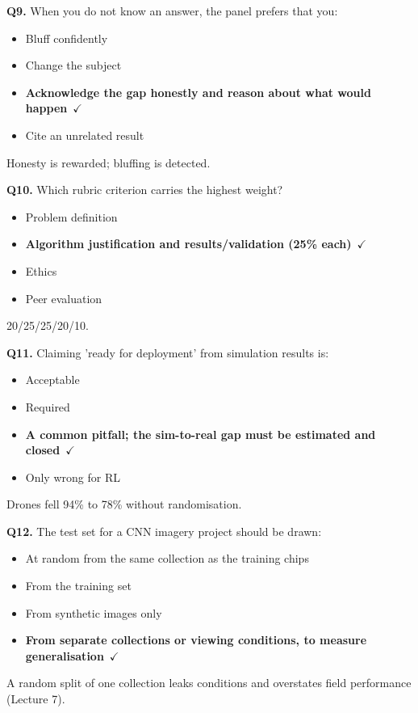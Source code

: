 \documentclass[11pt]{article}
\begin{document}
{\noindent\textbf{Q9.} When you do not know an answer, the panel prefers that you:\begin{itemize}[leftmargin=2.2em,itemsep=0pt,topsep=1pt]\item[A.] Bluff confidently\item[B.] Change the subject\item[\textbf{C.}] \textbf{Acknowledge the gap honestly and reason about what would happen}~{\color{GrnN}$\checkmark$}\item[D.] Cite an unrelated result\end{itemize} Honesty is rewarded; bluffing is detected.\par\medskip

\noindent\textbf{Q10.} Which rubric criterion carries the highest weight?\begin{itemize}[leftmargin=2.2em,itemsep=0pt,topsep=1pt]\item[A.] Problem definition\item[\textbf{B.}] \textbf{Algorithm justification and results/validation (25\% each)}~{\color{GrnN}$\checkmark$}\item[C.] Ethics\item[D.] Peer evaluation\end{itemize} 20/25/25/20/10.\par\medskip

\noindent\textbf{Q11.} Claiming 'ready for deployment' from simulation results is:\begin{itemize}[leftmargin=2.2em,itemsep=0pt,topsep=1pt]\item[A.] Acceptable\item[B.] Required\item[\textbf{C.}] \textbf{A common pitfall; the sim-to-real gap must be estimated and closed}~{\color{GrnN}$\checkmark$}\item[D.] Only wrong for RL\end{itemize} Drones fell 94\% to 78\% without randomisation.\par\medskip

\noindent\textbf{Q12.} The test set for a CNN imagery project should be drawn:\begin{itemize}[leftmargin=2.2em,itemsep=0pt,topsep=1pt]\item[A.] At random from the same collection as the training chips\item[B.] From the training set\item[C.] From synthetic images only\item[\textbf{D.}] \textbf{From separate collections or viewing conditions, to measure generalisation}~{\color{GrnN}$\checkmark$}\end{itemize} A random split of one collection leaks conditions and overstates field performance (Lecture 7).\par\medskip

}
\end{document}
